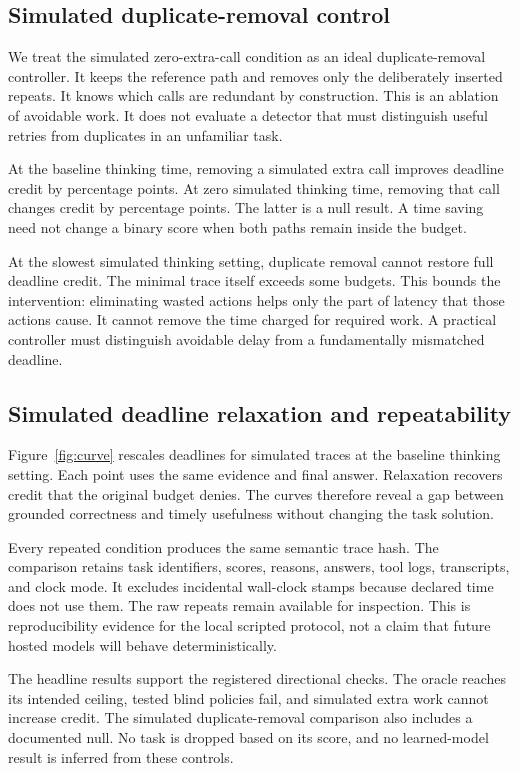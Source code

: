 \documentclass{article}
\begin{document}
\subsection{Simulated duplicate-removal control}
We treat the simulated zero-extra-call condition as an ideal duplicate-removal controller. It keeps the reference path and removes only the deliberately inserted repeats. It knows which calls are redundant by construction. This is an ablation of avoidable work. It does not evaluate a detector that must distinguish useful retries from duplicates in an unfamiliar task.\par
At the baseline thinking time, removing a simulated extra call improves deadline credit by \OneDelta{} percentage points. At zero simulated thinking time, removing that call changes credit by \NullDelta{} percentage points. The latter is a null result. A time saving need not change a binary score when both paths remain inside the budget.\par

At the slowest simulated thinking setting, duplicate removal cannot restore full deadline credit. The minimal trace itself exceeds some budgets. This bounds the intervention: eliminating wasted actions helps only the part of latency that those actions cause. It cannot remove the time charged for required work. A practical controller must distinguish avoidable delay from a fundamentally mismatched deadline.\par
\subsection{Simulated deadline relaxation and repeatability}
Figure~\ref{fig:curve} rescales deadlines for simulated traces at the baseline thinking setting. Each point uses the same evidence and final answer. Relaxation recovers credit that the original budget denies. The curves therefore reveal a gap between grounded correctness and timely usefulness without changing the task solution.\par

Every repeated condition produces the same semantic trace hash. The comparison retains task identifiers, scores, reasons, answers, tool logs, transcripts, and clock mode. It excludes incidental wall-clock stamps because declared time does not use them. The raw repeats remain available for inspection. This is reproducibility evidence for the local scripted protocol, not a claim that future hosted models will behave deterministically.\par
The headline results support the registered directional checks. The oracle reaches its intended ceiling, tested blind policies fail, and simulated extra work cannot increase credit. The simulated duplicate-removal comparison also includes a documented null. No task is dropped based on its score, and no learned-model result is inferred from these controls.\par
\end{document}

